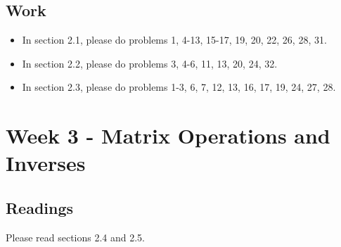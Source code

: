 	\subsection{Work}
		\begin{itemize}
			\item In section 2.1, please do problems 1, 4-13, 15-17, 19, 20, 22, 26, 28, 31.
			\item In section 2.2, please do problems 3, 4-6, 11, 13, 20, 24, 32.
			\item In section 2.3, please do problems 1-3, 6, 7, 12, 13, 16, 17, 19, 24, 27, 28.
		\end{itemize}

	\clearpage



	\section{Week 3 - Matrix Operations and Inverses}

	\subsection{Readings}
		Please read sections 2.4 and 2.5.

